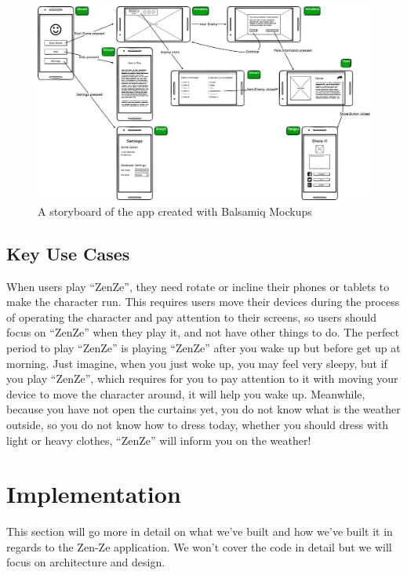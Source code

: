 \documentclass{sigchi}
\begin{document}
\begin{figure}
\label{fig:storyboard}
	\centering
	\includegraphics[width=7in]{figures/UIDesign/Storyboard.png}
	\caption{A storyboard of the app created with Balsamiq Mockups}
\end{figure}



\subsection{Key Use Cases}
When users play ``ZenZe'', they need rotate or incline their phones or tablets to make the character run. This requires users move their devices during the process of operating the character and pay attention to their screens,  so users should focus on ``ZenZe'' when they play it, and not have other things to do. 
The perfect period to play ``ZenZe'' is playing ``ZenZe'' after you wake up but before get up at morning. Just imagine,  when you just woke up, you may feel very sleepy, but if you play ``ZenZe'', which requires for you to pay attention to it with moving your device to move the character around, it will help you wake up. Meanwhile, because you have not open the curtains yet, you do not know what is the weather outside, so you do not know how to dress today, whether you should dress with light or heavy clothes, ``ZenZe'' will inform you on the weather!


\section{Implementation}

This section will go more in detail on what we've built and how we've built it in regards to the Zen-Ze application. We won't cover the code in detail but we will focus on architecture and design.
\end{document}
